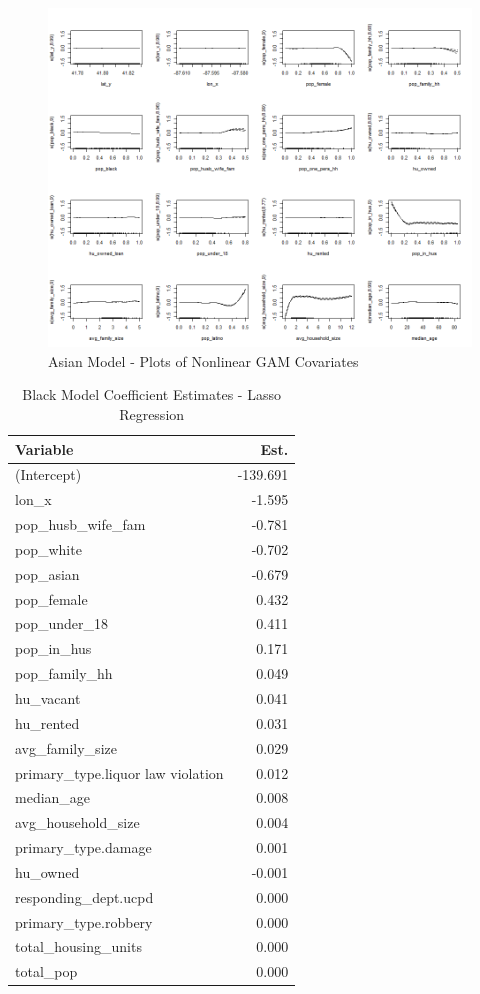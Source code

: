 \documentclass{ucetd}
\begin{document}
\begin{figure}
\centering
\includegraphics[width=1\textwidth,height=\textheight]{..//Modeling/modeling_files/figure-gfm/gam-asian-1.png}
\caption{Asian Model - Plots of Nonlinear GAM Covariates}
\end{figure}

\begin{table}

\caption{\label{tab:black-lasso}Black Model Coefficient Estimates - Lasso Regression}
\centering
\begin{tabular}[t]{l|r}
\hline
Variable & Est.\\
\hline
(Intercept) & -139.691\\
\hline
lon\_x & -1.595\\
\hline
pop\_husb\_wife\_fam & -0.781\\
\hline
pop\_white & -0.702\\
\hline
pop\_asian & -0.679\\
\hline
pop\_female & 0.432\\
\hline
pop\_under\_18 & 0.411\\
\hline
pop\_in\_hus & 0.171\\
\hline
pop\_family\_hh & 0.049\\
\hline
hu\_vacant & 0.041\\
\hline
hu\_rented & 0.031\\
\hline
avg\_family\_size & 0.029\\
\hline
primary\_type.liquor law violation & 0.012\\
\hline
median\_age & 0.008\\
\hline
avg\_household\_size & 0.004\\
\hline
primary\_type.damage & 0.001\\
\hline
hu\_owned & -0.001\\
\hline
responding\_dept.ucpd & 0.000\\
\hline
primary\_type.robbery & 0.000\\
\hline
total\_housing\_units & 0.000\\
\hline
total\_pop & 0.000\\
\hline
\end{tabular}
\end{table}
\end{document}
